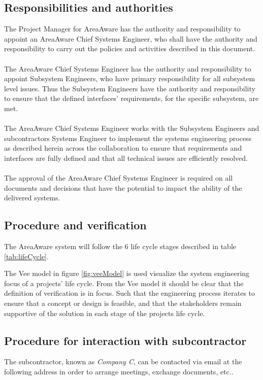 \subsection{Responsibilities and authorities}
The Project Manager for AreaAware has the authority and responsibility to appoint an AreaAware Chief Systems Engineer, who shall have the authority and responsibility to carry out the policies and activities described in this document.\\\\
The AreaAware Chief Systems Engineer has the authority and responsibility to appoint Subsystem Engineers, who have primary responsibility for all subsystem level issues.
Thus the Subsystem Engineers have the authority and responsibility to ensure that the defined interfaces' requirements, for the specific subsystem, are met.\\\\
The AreaAware Chief Systems Engineer works with the Subsystem Engineers and subcontractors Systems Engineer to implement the systems engineering process as described herein across the collaboration to ensure that requirements and interfaces are fully defined and that all technical issues are efficiently resolved.\\\\
The approval of the AreaAware Chief Systems Engineer is required on all documents and decisions that have the potential to impact the ability of the delivered systems.

\subsection{Procedure and verification}
The AreaAware system will follow the 6 life cycle stages described in table \ref{tab:lifeCycle}.


The Vee model in figure \ref{fig:veeModel} is used visualize the system engineering focus of a projects' life cycle.
From the Vee model it should be clear that the definition of verification is in focus.
Such that the engineering process iterates to ensure that a concept or design is feasible, and that the stakeholders remain supportive of the solution in each stage of the projects life cycle.


\subsection{Procedure for interaction with subcontractor}
The subcontractor, known as \emph{Company C}, can be contacted via email at the following address in order to arrange meetings, exchange documents, etc..\\\\

